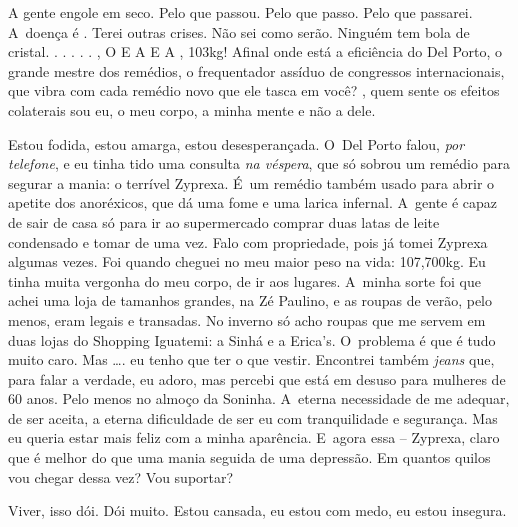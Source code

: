 A gente engole em seco. Pelo que passou. Pelo que passo. Pelo que
passarei. A~doença é . Terei outras crises. Não sei como serão.
Ninguém tem bola de cristal.  .  .  
 .   .     
  .      
,  O  E A     E A ,
103kg! Afinal onde está a eficiência do Del Porto, o grande mestre dos
remédios, o frequentador assíduo de congressos internacionais, que vibra
com cada remédio novo que ele tasca em você?    , quem
sente os efeitos colaterais sou eu, o meu corpo, a minha mente e não a
dele.

Estou fodida, estou amarga, estou desesperançada. O~Del Porto falou,
\emph{por telefone}, e eu tinha tido uma consulta \emph{na véspera}, que
só sobrou um remédio para segurar a mania: o terrível Zyprexa. É~um
remédio também usado para abrir o apetite dos anoréxicos, que dá uma
fome e uma larica infernal. A~gente é capaz de sair de casa só para ir
ao supermercado comprar duas latas de leite condensado e tomar de uma
vez. Falo com propriedade, pois já tomei Zyprexa algumas vezes. Foi
quando cheguei no meu maior peso na vida: 107,700kg. Eu tinha muita
vergonha do meu corpo, de ir aos lugares. A~minha sorte foi que achei
uma loja de tamanhos grandes, na Zé Paulino, e as roupas de verão, pelo
menos, eram legais e transadas. No inverno só acho roupas que me servem
em duas lojas do Shopping Iguatemi: a Sinhá e a Erica's. O~problema é
que é tudo muito caro. Mas …. eu tenho que ter o que vestir.
Encontrei também \emph{jeans} que, para falar a verdade, eu adoro, mas
percebi que está em desuso para mulheres de 60 anos. Pelo menos no
almoço da Soninha. A~eterna necessidade de me adequar, de ser aceita, a
eterna dificuldade de ser eu com tranquilidade e segurança. Mas eu
queria estar mais feliz com a minha aparência. E~agora essa -- Zyprexa,
claro que é melhor do que uma mania seguida de uma depressão. Em quantos
quilos vou chegar dessa vez? Vou suportar?

Viver, isso dói. Dói muito. Estou cansada, eu estou com medo, eu estou
insegura.

